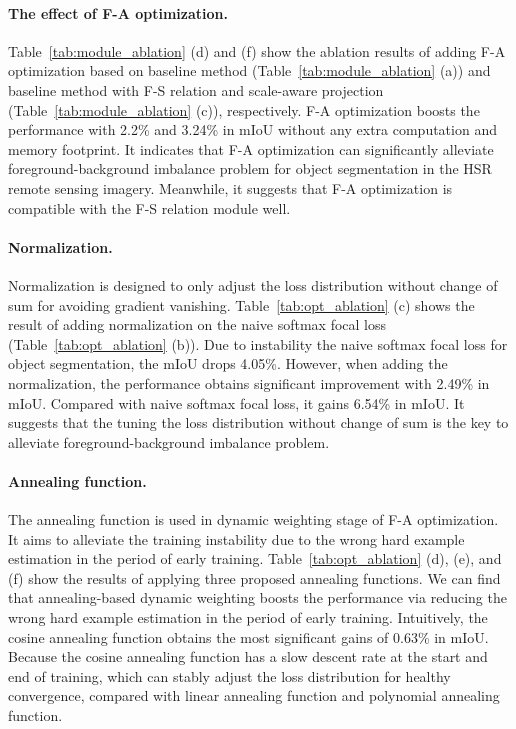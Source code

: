 \documentclass[10pt,twocolumn,letterpaper]{article}
\begin{document}
\paragraph{The effect of F-A optimization.}
Table~\ref{tab:module_ablation} (d) and (f) show the ablation results of adding F-A optimization based on baseline method (Table~\ref{tab:module_ablation} (a)) and baseline method with F-S relation and scale-aware projection (Table~\ref{tab:module_ablation} (c)), respectively.
F-A optimization boosts the performance with 2.2\% and 3.24\% in mIoU without any extra computation and memory footprint.
It indicates that F-A optimization can significantly alleviate foreground-background imbalance problem for object segmentation in the HSR remote sensing imagery.
Meanwhile, it suggests that F-A optimization is compatible with the F-S relation module well.

\paragraph{Normalization.}
Normalization is designed to only adjust the loss distribution without change of sum for avoiding gradient vanishing.
Table~\ref{tab:opt_ablation} (c) shows the result of adding normalization on the naive softmax focal loss (Table~\ref{tab:opt_ablation} (b)).
Due to instability the naive softmax focal loss for object segmentation, the mIoU drops 4.05\%.
However, when adding the normalization, the performance obtains significant improvement with 2.49\% in mIoU.
Compared with naive softmax focal loss, it gains 6.54\% in mIoU.
It suggests that the tuning the loss distribution without change of sum is the key to alleviate foreground-background imbalance problem.


\paragraph{Annealing function.}
The annealing function is used in dynamic weighting stage of F-A optimization.
It aims to alleviate the training instability due to the wrong hard example estimation in the period of early training.
Table~\ref{tab:opt_ablation} (d), (e), and (f) show the results of applying three proposed annealing functions.
We can find that annealing-based dynamic weighting boosts the performance via reducing the wrong hard example estimation in the period of early training.
Intuitively, the cosine annealing function obtains the most significant gains of 0.63\% in mIoU.
Because the cosine annealing function has a slow descent rate at the start and end of training, which can stably adjust the loss distribution for healthy convergence, compared with linear annealing function and polynomial annealing function.
\end{document}
